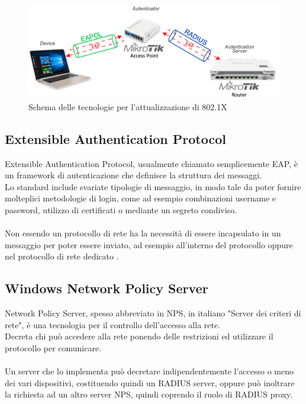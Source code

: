 \documentclass[Tesi.tex]{subfiles}
\begin{document}
\begin{figure}[H]
	\centering
	\includegraphics[width=1\linewidth]{"images/Schema_tecnologie"}
	\caption{Schema delle tecnologie per l'attualizzazione di 802.1X}
	\label{fig:Schema delle tecnologie per l'attualizzazione di 802.1X}
\end{figure}

\subsection{Extensible Authentication Protocol}
Extensible Authentication Protocol, usualmente chiamato semplicemente EAP, è un framework di autenticazione che definisce la struttura dei messaggi. \\
Lo standard include svariate tipologie di messaggio, in modo tale da poter fornire molteplici metodologie di login, come ad esempio combinazioni username e password, utilizzo di certificati o mediante un segreto condiviso. \\\\
Non essendo un protocollo di rete ha la necessità di essere incapsulato in un messaggio per poter essere inviato, ad esempio all'interno del protocollo  oppure nel protocollo di rete dedicato .

\subsection{Windows Network Policy Server}
Network Policy Server, spesso abbreviato in NPS, in italiano "Server dei criteri di rete", è una tecnologia per il controllo dell'accesso alla rete. \\
Decreta chi può accedere alla rete ponendo delle restrizioni ed utilizzare il protocollo  per comunicare. \\\\
Un server che lo implementa può decretare indipendentemente l'accesso o meno dei vari dispositivi, costituendo quindi un RADIUS server, oppure può inoltrare la richiesta ad un altro server NPS, quindi coprendo il ruolo di RADIUS proxy.
\end{document}
